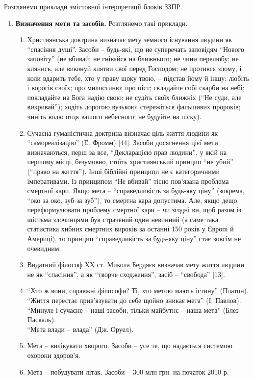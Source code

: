 Розглянемо приклади змістовної інтерпретації блоків ЗЗПР.
\begin{enumerate}
	\item \textbf{Визначення мети та засобів.} Розглянемо такі приклади.
	\begin{enumerate}
		\item Християнська доктрина визначає мету земного існування людини як ``спасіння душі''. Засоби -- будь-які, що не суперечать заповідям ``Нового заповіту'' (не вбивай; не гнівайся на ближнього; не чини перелюбу; не клянись, але виконуй клятви свої перед Господом; не протився злому, і коли вдарить тебе, хто у праву щоку твою, -- підстав йому й іншу; любіть і ворогів своїх; про милостиню; про піст; складайте собі скарби на небі; покладайте на Бога надію свою; не судіть своїх ближніх (``Не суди, але викривай''); ходіть дорогою вузькою; стережіться фальшивих пророків; чиніть волю отця вашого небесного; не будуйте на піску).
		\item Сучасна гуманістична доктрина визначає ціль життя людини як ``самореалізацію'' (Е. Фромм) [44]. Засоби досягнення цієї мети визначаються, перш за все, ``Декларацією прав людини'', у якій на першому місці, безумовно, стоїть християнський принцип ``не убий'' (``право на життя''). Інші біблійні принципи не є категоричними імперативами. Із принципом ``Не вбивай'' тісно пов'язана проблема смертної кари. Якщо мета -- ``справедливість за будь-яку ціну'' (зокрема, ``око за око, зуб за зуб''), то смертна кара допустима. Але, якщо дещо переформулювати проблему смертної кари -- чи згодні ви, щоб разом із шістьма злочинцями був страчений один невинний (а саме така статистика хибних смертних вироків за останні 150 років у Європі й Америці), то принцип ``справедливість за будь-яку ціну'' стає зовсім не очевидним.
		\item Видатний філософ ХХ ст. Микола Бердяєв визначав мету життя людини не як ``спасіння'', а як ``творче сходження'', засіб -- ``свобода'' [13].
		\item ``Хто ж вони, справжні філософи? Ті, хто метою мають істину'' (Платон). \\
		``Життя перестає прив'язувати до себе щойно зникає мета'' (І. Павлов). \\ 
		``Минуле і сучасне -- наші засоби, тільки майбутнє -- наша мета'' (Блез Паскаль). \\
		``Мета влади -- влада'' (Дж. Оруел).
		\item Мета -- вилікувати хворого. Засоби -- усе те, що надається системою охорони здоров'я.
		\item Мета -- побудувати літак. Засоби -- 300 млн грн. на початок 2010 р. 

\end{enumerate}
\end{enumerate}

